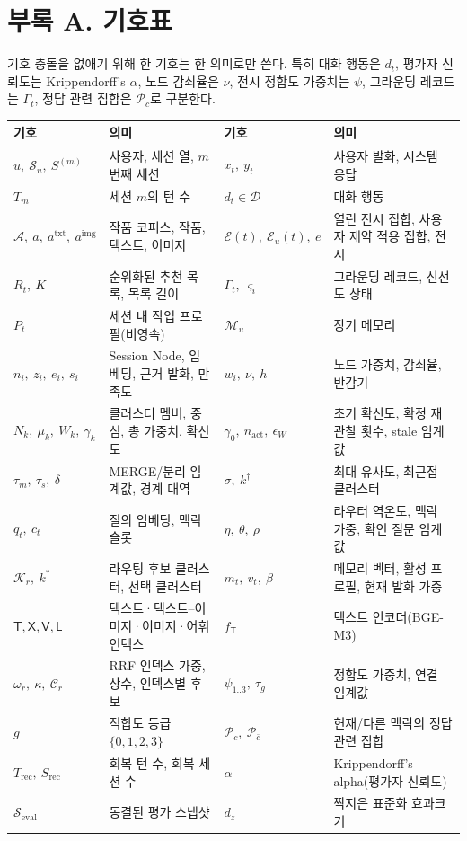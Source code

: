 \documentclass[10pt,twocolumn,letterpaper]{article}
\newcommand{\sT}{\mathsf{T}}
\newcommand{\sX}{\mathsf{X}}
\newcommand{\sV}{\mathsf{V}}
\newcommand{\sL}{\mathsf{L}}
\newcommand{\cA}{\mathcal{A}}
\newcommand{\cE}{\mathcal{E}}
\newcommand{\cP}{\mathcal{P}}
\newcommand{\cM}{\mathcal{M}}
\newcommand{\cD}{\mathcal{D}}
\newcommand{\cK}{\mathcal{K}}
\newcommand{\cS}{\mathcal{S}}
\begin{document}
\clearpage
\appendix
\onecolumn\raggedbottom
\section*{부록 A. 기호표}
기호 충돌을 없애기 위해 한 기호는 한 의미로만 쓴다. 특히 대화 행동은 $d_t$, 평가자 신뢰도는 Krippendorff's $\alpha$, 노드 감쇠율은 $\nu$, 전시 정합도 가중치는 $\psi$, 그라운딩 레코드는 $\Gamma_t$, 정답 관련 집합은 $\cP_c$로 구분한다.

\begin{center}\small
\setlength{\tabcolsep}{5pt}
\renewcommand{\arraystretch}{1.12}
\begin{tabularx}{\textwidth}{@{}l>{\raggedright\arraybackslash}X l>{\raggedright\arraybackslash}X@{}}
\toprule
기호 & 의미 & 기호 & 의미 \\
\midrule
$u,\ \cS_u,\ S^{(m)}$ & 사용자, 세션 열, $m$번째 세션 & $x_t,\ y_t$ & 사용자 발화, 시스템 응답 \\
$T_m$ & 세션 $m$의 턴 수 & $d_t\in\cD$ & 대화 행동 \\
$\cA,\ a,\ a^{\mathrm{txt}},\ a^{\mathrm{img}}$ & 작품 코퍼스, 작품, 텍스트, 이미지 & $\cE(t),\ \cE_u(t),\ e$ & 열린 전시 집합, 사용자 제약 적용 집합, 전시 \\
$R_t,\ K$ & 순위화된 추천 목록, 목록 길이 & $\Gamma_t,\ \varsigma_i$ & 그라운딩 레코드, 신선도 상태 \\
$P_t$ & 세션 내 작업 프로필(비영속) & $\cM_u$ & 장기 메모리 \\
$n_i,\ z_i,\ e_i,\ s_i$ & Session Node, 임베딩, 근거 발화, 만족도 & $w_i,\ \nu,\ h$ & 노드 가중치, 감쇠율, 반감기 \\
$N_k,\ \mu_k,\ W_k,\ \gamma_k$ & 클러스터 멤버, 중심, 총 가중치, 확신도 & $\gamma_0,\ n_{\mathrm{act}},\ \epsilon_W$ & 초기 확신도, 확정 재관찰 횟수, stale 임계값 \\
$\tau_m,\ \tau_s,\ \delta$ & MERGE/분리 임계값, 경계 대역 & $\sigma,\ k^\dagger$ & 최대 유사도, 최근접 클러스터 \\
$q_t,\ c_t$ & 질의 임베딩, 맥락 슬롯 & $\eta,\ \theta,\ \rho$ & 라우터 역온도, 맥락 가중, 확인 질문 임계값 \\
$\cK_r,\ k^\ast$ & 라우팅 후보 클러스터, 선택 클러스터 & $m_t,\ v_t,\ \beta$ & 메모리 벡터, 활성 프로필, 현재 발화 가중 \\
$\sT,\sX,\sV,\sL$ & 텍스트·텍스트–이미지·이미지·어휘 인덱스 & $f_\sT$ & 텍스트 인코더(BGE-M3) \\
$\omega_r,\ \kappa,\ \mathcal{C}_r$ & RRF 인덱스 가중, 상수, 인덱스별 후보 & $\psi_{1..3},\ \tau_g$ & 정합도 가중치, 연결 임계값 \\
$g$ & 적합도 등급 $\{0,1,2,3\}$ & $\cP_c,\ \cP_{\bar c}$ & 현재/다른 맥락의 정답 관련 집합 \\
$T_{\mathrm{rec}},\ S_{\mathrm{rec}}$ & 회복 턴 수, 회복 세션 수 & $\alpha$ & Krippendorff's alpha(평가자 신뢰도) \\
$\cS_{\mathrm{eval}}$ & 동결된 평가 스냅샷 & $d_z$ & 짝지은 표준화 효과크기 \\
\bottomrule
\end{tabularx}
\end{center}
\end{document}

